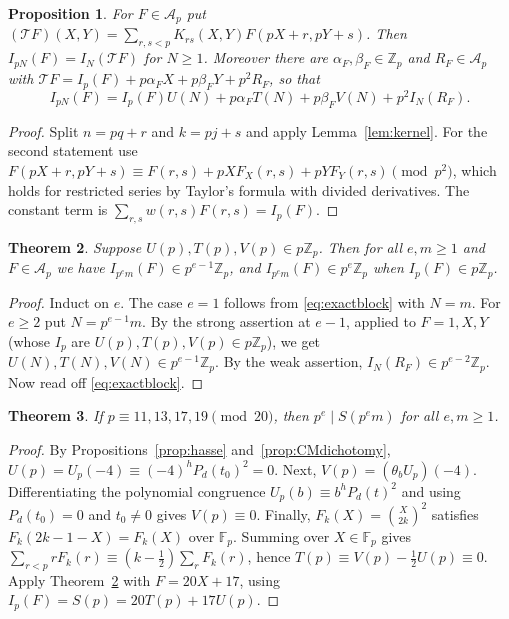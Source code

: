 \documentclass[11pt]{amsart}
\newtheorem{theorem}{Theorem}[section]
\newtheorem{proposition}[theorem]{Proposition}
\theoremstyle{definition}
\theoremstyle{remark}
\newcommand{\F}{\mathbb{F}}
\newcommand{\Zp}{\mathbb{Z}_p}
\begin{document}
\begin{proposition}\label{prop:block}
For $F\in\mathcal A_p$ put $(\mathcal T F)(X,Y)=\sum_{r,s<p}K_{rs}(X,Y)F(pX+r,pY+s)$. Then
$I_{pN}(F)=I_N(\mathcal TF)$ for $N\ge1$. Moreover there are $\alpha_F,\beta_F\in\Zp$ and
$R_F\in\mathcal A_p$ with $\mathcal TF=I_p(F)+p\alpha_FX+p\beta_FY+p^2R_F$, so that
\begin{equation}\label{eq:exactblock}
 I_{pN}(F)=I_p(F)U(N)+p\alpha_FT(N)+p\beta_FV(N)+p^2I_N(R_F).
\end{equation}
\end{proposition}
\begin{proof}
Split $n=pq+r$ and $k=pj+s$ and apply Lemma~\ref{lem:kernel}. For the second statement use
$F(pX+r,pY+s)\equiv F(r,s)+pXF_X(r,s)+pYF_Y(r,s)\pmod{p^2}$, which holds for restricted series by
Taylor's formula with divided derivatives. The constant term is
$\sum_{r,s}w(r,s)F(r,s)=I_p(F)$.
\end{proof}

\begin{theorem}\label{thm:induction}
Suppose $U(p),T(p),V(p)\in p\Zp$. Then for all $e,m\ge1$ and $F\in\mathcal A_p$ we have
$I_{p^em}(F)\in p^{e-1}\Zp$, and $I_{p^em}(F)\in p^e\Zp$ when $I_p(F)\in p\Zp$.
\end{theorem}
\begin{proof}
Induct on $e$. The case $e=1$ follows from \eqref{eq:exactblock} with $N=m$. For $e\ge2$ put
$N=p^{e-1}m$. By the strong assertion at $e-1$, applied to $F=1,X,Y$ (whose $I_p$ are
$U(p),T(p),V(p)\in p\Zp$), we get $U(N),T(N),V(N)\in p^{e-1}\Zp$. By the weak assertion,
$I_N(R_F)\in p^{e-2}\Zp$. Now read off \eqref{eq:exactblock}.
\end{proof}

\begin{theorem}\label{thm:inert}
If $p\equiv11,13,17,19\pmod{20}$, then $p^e\mid S(p^em)$ for all $e,m\ge1$.
\end{theorem}
\begin{proof}
By Propositions~\ref{prop:hasse} and~\ref{prop:CMdichotomy}, $U(p)=U_p(-4)\equiv(-4)^hP_d(t_0)^2=0$.
Next, $V(p)=(\theta_bU_p)(-4)$. Differentiating the polynomial congruence
$U_p(b)\equiv b^hP_d(t)^2$ and using $P_d(t_0)=0$ and $t_0\ne0$ gives $V(p)\equiv0$. Finally,
$F_k(X)=\binom X{2k}^2$ satisfies $F_k(2k-1-X)=F_k(X)$ over $\F_p$. Summing over $X\in\F_p$ gives
$\sum_{r<p}rF_k(r)\equiv(k-\frac12)\sum_rF_k(r)$, hence $T(p)\equiv V(p)-\frac12U(p)\equiv0$.
Apply Theorem~\ref{thm:induction} with $F=20X+17$, using $I_p(F)=S(p)=20T(p)+17U(p)$.
\end{proof}
\end{document}

